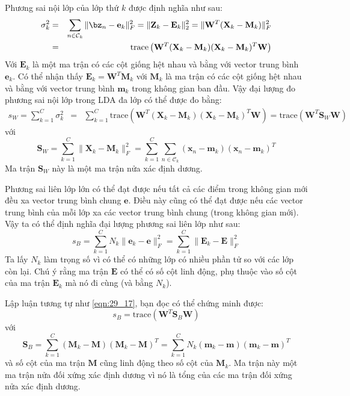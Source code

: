 Phương sai nội lớp của lớp thứ $k$ được định nghĩa như sau:
\begin{eqnarray} 
    \label{eqn:29_15}
    \sigma_k^2 &=& \sum_{n \in \mathcal{C}_k} \|\bz_n -\mathbf{e}_k\|_F^2 = \|\mathbf{Z}_k - \mathbf{E}_k\|_2^2 
    = \|\mathbf{W}^T (\mathbf{X}_k - \mathbf{M}_k) \|_F^2\\\ 
    &=& \text{trace}\left(\mathbf{W}^T (\mathbf{X}_k - \mathbf{M}_k)(\mathbf{X}_k - \mathbf{M}_k)^T \mathbf{W}\right) 
\end{eqnarray} 
Với $\mathbf{E}_k$ là một ma trận có các cột giống hệt nhau và bằng với vector trung bình $\mathbf{e}_k$. Có thể nhận thấy $ \mathbf{E}_k =
\mathbf{W}^T\mathbf{M}_k$ với $\mathbf{M}_k$ là ma trận có các cột giống hệt
nhau và bằng với vector trung bình $\mathbf{m}_k$ trong không gian ban đầu. 
Vậy đại lượng đo phương sai nội lớp trong LDA đa lớp có thể được đo bằng: 
\begin{eqnarray} 
    \nonumber
    \label{eqn:29_17}
    s_W = \sum_{k = 1}^C \sigma_k^2 &=& \sum_{k=1}^C
    \text{trace}\left(\mathbf{W}^T (\mathbf{X}_k - \mathbf{M}_k)(\mathbf{X}_k - \mathbf{M}_k)^T \mathbf{W}\right) = \text{trace}\left( \mathbf{W}^T\mathbf{S}_W \mathbf{W}\right) 
\end{eqnarray} 
với
\begin{equation} 
    \label{eqn:29_19}
    \mathbf{S}_W = \sum_{k=1}^C \|\mathbf{X}_k- \mathbf{M}_k \|_F^2 = \sum_{k=1}^C \sum_{n \in \mathcal{C}_k} (\mathbf{x}_n - \mathbf{m}_k)(\mathbf{x}_n - \mathbf{m}_k)^T
\end{equation} 
Ma trận $\mathbf{S}_W$ này là một ma trận nửa xác định dương. 
 
 
Phương sai liên lớp lớn có thể đạt được nếu tất cả các điểm trong
không gian mới đều xa vector trung bình chung $\mathbf{e}$. Điều này cũng có thể
đạt được nếu các vector trung bình của mỗi lớp xa các vector trung bình chung
(trong không gian mới). Vậy ta có thể định nghĩa đại lượng phương sai liên lớp như sau:
\begin{equation} 
    \label{eqn:29_20}
    s_B = \sum_{k=1}^C N_k \|\mathbf{e}_k - \mathbf{e} \|_F^2 = \sum_{k=1}^C \|\mathbf{E}_k - \mathbf{E} \|_F^2
\end{equation} 
Ta lấy $N_k$ làm trọng số vì có thể có những lớp có nhiều phần tử so với các
lớp còn lại. Chú ý rằng ma trận $\mathbf{E}$ có thể có số cột {linh
động}, phụ thuộc vào số cột của ma trận $\mathbf{E}_k$ mà nó đi cùng (và bằng $N_k$).
 
Lập luận tương tự như \eqref{eqn:29_17}, bạn đọc có thể chứng minh được: 
\begin{equation} 
    \label{eqn:29_21}
    s_B = \text{trace} \left(\mathbf{W}^T \mathbf{S}_B \mathbf{W} \right)
\end{equation} 
với
\begin{equation} 
    \label{eqn:29_22}
    \mathbf{S}_B = \sum_{k = 1}^C (\mathbf{M}_k - \mathbf{M})(\mathbf{M}_k - \mathbf{M})^T = \sum_{k=1}^C N_k (\mathbf{m}_k - \mathbf{m})(\mathbf{m}_k - \mathbf{m})^T
\end{equation} 
và số cột của ma trận $\mathbf{M}$ cũng {linh động} theo số cột của $\mathbf{M}_k$. Ma trận này một ma trận nửa đối xứng xác định dương vì nó là 
  tổng của các ma trận đối xứng nửa xác định dương. 
 
